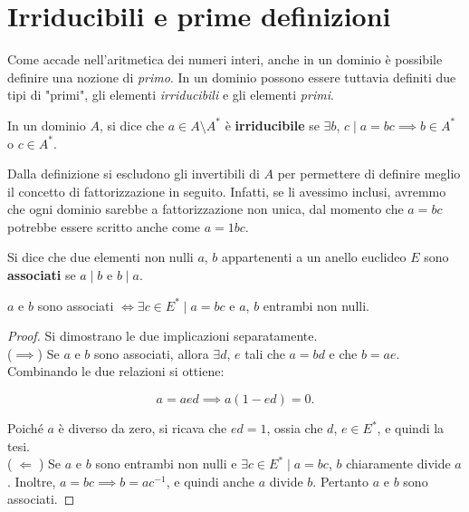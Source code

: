 \documentclass[11pt]{scrbook}
\begin{document}
\section{Irriducibili e prime definizioni}

Come accade nell'aritmetica dei numeri interi, anche in un dominio è possibile definire
una nozione di \textit{primo}. In un dominio possono essere tuttavia definiti due tipi di "primi",
gli elementi \textit{irriducibili} e gli elementi \textit{primi}.

\begin{definition}
    In un dominio $A$, si dice che $a \in A \setminus A^*$ è \textbf{irriducibile} se
    $\exists b$, $c \mid a=bc \implies b \in A^*$ o $c \in A^*$.
\end{definition}

\begin{remark*}
    Dalla definizione si escludono gli invertibili di $A$ per permettere
    di definire meglio il concetto di fattorizzazione in seguito. Infatti,
    se li avessimo inclusi, avremmo che ogni dominio sarebbe a fattorizzazione
    non unica, dal momento che $a=bc$ potrebbe essere scritto anche come
    $a=1bc$.
\end{remark*}

\begin{definition}
    Si dice che due elementi non nulli $a$, $b$ appartenenti a un anello euclideo
    $E$ sono \textbf{associati} se $a \mid b$ e $b \mid a$.
\end{definition}

\begin{proposition}
    \label{prop:associati}
    $a$ e $b$ sono associati $\iff \exists c \in E^* \mid a=bc$ e $a$, $b$ entrambi non nulli.
\end{proposition}

\begin{proof} Si dimostrano le due implicazioni separatamente. \\

    ($\implies$) Se $a$ e $b$ sono associati, allora $\exists d$, $e$ tali che $a=bd$ e che $b=ae$. Combinando le due relazioni si ottiene:

    \[ a=aed \implies a(1-ed)=0.\]

    Poiché $a$ è diverso da zero, si ricava che $ed=1$, ossia
    che $d$, $e \in E^*$, e quindi la tesi. \\

    ($\;\Longleftarrow\;$) Se $a$ e $b$ sono entrambi non
    nulli e $\exists c \in E^* \mid a=bc$, $b$ chiaramente
    divide $a$. Inoltre, $a=bc \implies b=ac^{-1}$, e quindi
    anche $a$ divide $b$. Pertanto $a$ e $b$ sono associati.
\end{proof}
\end{document}
